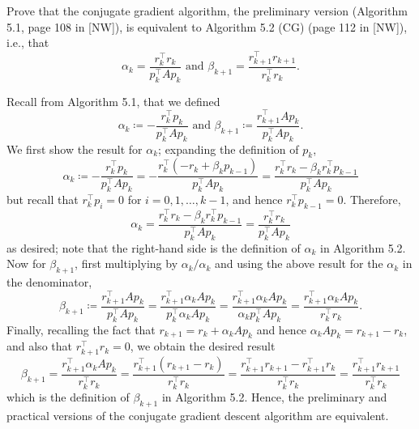 \documentclass{../../../kin_math}
\begin{document}
\begin{questions}
  \question Prove that the conjugate gradient algorithm, the preliminary version (Algorithm 5.1, page 108 in [NW]), is equivalent to Algorithm 5.2 (CG) (page 112 in [NW]), i.e., that
  \begin{equation}
    \alpha_k = \frac{r_k^\top r_k}{p_k^\top A p_k} \text{ and } \beta_{k + 1} = \frac{r_{k + 1}^\top r_{k + 1}}{r_k^\top r_k}.
  \end{equation}
  \begin{solution}
    Recall from Algorithm 5.1, that we defined
    \begin{equation*}
      \alpha_k \coloneqq - \frac{r_k^\top p_k}{p_k^\top A p_k} \text{ and } \beta_{k + 1} \coloneqq \frac{r_{k + 1}^\top A p_k}{p_k^\top A p_k}.
    \end{equation*}
    We first show the result for $\alpha_k$; expanding the definition of $p_k$,
    \begin{equation*}
      \alpha_k \coloneqq - \frac{r_k^\top p_k}{p_k^\top A p_k} = - \frac{r_k^\top (-r_k + \beta_k p_{k - 1})}{p_k^\top A p_k} = \frac{r_k^\top r_k - \beta_k r_k^\top p_{k - 1}}{p_k^\top A p_k}
    \end{equation*}
    but recall that $r_k^\top p_i = 0$ for $i = 0, 1, \dots, k - 1$, and hence $r_k^\top p_{k - 1} = 0$. Therefore,
    \begin{equation*}
      \alpha_k = \frac{r_k^\top r_k - \beta_k r_k^\top p_{k - 1}}{p_k^\top A p_k} = \frac{r_k^\top r_k}{p_k^\top A p_k}
    \end{equation*}
    as desired; note that the right-hand side is the definition of $\alpha_k$ in Algorithm 5.2. Now for $\beta_{k + 1}$, first multiplying by $\alpha_k / \alpha_k$ and using the above result for the $\alpha_k$ in the denominator,
    \begin{equation*}
      \beta_{k + 1} \coloneqq \frac{r_{k + 1}^\top A p_k}{p_k^\top A p_k} = \frac{r_{k + 1}^\top \alpha_k A p_k}{p_k^\top \alpha_k A p_k} = \frac{r_{k + 1}^\top \alpha_k A p_k}{\alpha_k p_k^\top A p_k} = \frac{r_{k + 1}^\top \alpha_k A p_k}{r_k^\top r_k}.
    \end{equation*}
    Finally, recalling the fact that $r_{k + 1} = r_k + \alpha_k A p_k$ and hence $\alpha_k A p_k = r_{k + 1} - r_k$, and also that $r_{k + 1}^\top r_k = 0$, we obtain the desired result
    \begin{equation*}
      \beta_{k + 1} = \frac{r_{k + 1}^\top \alpha_k A p_k}{r_k^\top r_k} = \frac{r_{k + 1}^\top (r_{k + 1} - r_k)}{r_k^\top r_k} = \frac{r_{k + 1}^\top r_{k + 1} - r_{k + 1}^\top r_k}{r_k^\top r_k} = \frac{r_{k + 1}^\top r_{k + 1}}{r_k^\top r_k}
    \end{equation*}
    which is the definition of $\beta_{k + 1}$ in Algorithm 5.2. Hence, the preliminary and practical versions of the conjugate gradient descent algorithm are equivalent.
  \end{solution}


\end{questions}
\end{document}
